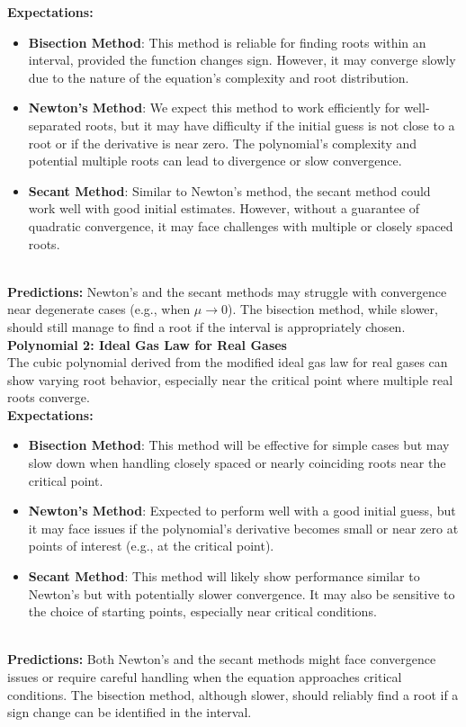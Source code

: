 \documentclass[12pt]{article}
\begin{document}
\noindent \textbf{Expectations:}
\begin{itemize}
    \item \textbf{Bisection Method}: This method is reliable for finding roots within an interval, provided the function changes sign. However, it may converge slowly due to the nature of the equation's complexity and root distribution.
    \item \textbf{Newton’s Method}: We expect this method to work efficiently for well-separated roots, but it may have difficulty if the initial guess is not close to a root or if the derivative is near zero. The polynomial's complexity and potential multiple roots can lead to divergence or slow convergence.
    \item \textbf{Secant Method}: Similar to Newton’s method, the secant method could work well with good initial estimates. However, without a guarantee of quadratic convergence, it may face challenges with multiple or closely spaced roots.
\end{itemize}
\\
\textbf{Predictions:}
\noindent Newton’s and the secant methods may struggle with convergence near degenerate cases (e.g., when \( \mu \rightarrow 0 \)). The bisection method, while slower, should still manage to find a root if the interval is appropriately chosen.
\\
\textbf{Polynomial 2: Ideal Gas Law for Real Gases}
\\
\noindent The cubic polynomial derived from the modified ideal gas law for real gases can show varying root behavior, especially near the critical point where multiple real roots converge.
\\
\noindent \textbf{Expectations:}
\begin{itemize}
    \item \textbf{Bisection Method}: This method will be effective for simple cases but may slow down when handling closely spaced or nearly coinciding roots near the critical point.
    \item \textbf{Newton’s Method}: Expected to perform well with a good initial guess, but it may face issues if the polynomial's derivative becomes small or near zero at points of interest (e.g., at the critical point).
    \item \textbf{Secant Method}: This method will likely show performance similar to Newton’s but with potentially slower convergence. It may also be sensitive to the choice of starting points, especially near critical conditions.
\end{itemize}
\\
\textbf{Predictions:}
Both Newton’s and the secant methods might face convergence issues or require careful handling when the equation approaches critical conditions. The bisection method, although slower, should reliably find a root if a sign change can be identified in the interval.
\end{document}
